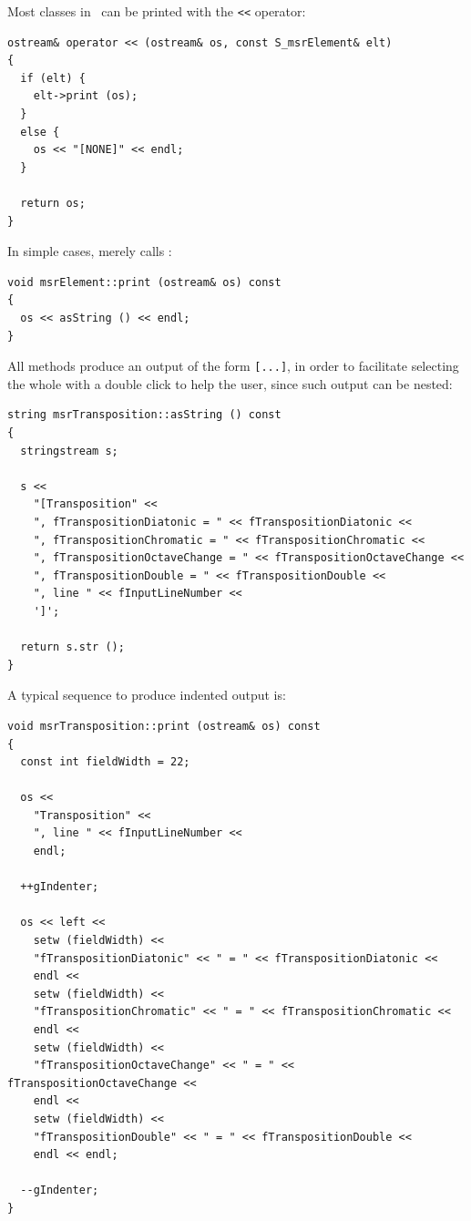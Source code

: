 Most classes in \mf\ can be printed with the {\tt <<} operator:
\begin{lstlisting}[language=CPlusPlus]
ostream& operator << (ostream& os, const S_msrElement& elt)
{
  if (elt) {
    elt->print (os);
  }
  else {
    os << "[NONE]" << endl;
  }

  return os;
}
\end{lstlisting}

In simple cases,  merely calls :
\begin{lstlisting}[language=CPlusPlus]
void msrElement::print (ostream& os) const
{
  os << asString () << endl;
}
\end{lstlisting}

All  methods produce an output of the form {\tt [...]}, in order to facilitate selecting the whole with a double click to help the user, since such output can be nested:
\begin{lstlisting}[language=CPlusPlus]
string msrTransposition::asString () const
{
  stringstream s;

  s <<
    "[Transposition" <<
    ", fTranspositionDiatonic = " << fTranspositionDiatonic <<
    ", fTranspositionChromatic = " << fTranspositionChromatic <<
    ", fTranspositionOctaveChange = " << fTranspositionOctaveChange <<
    ", fTranspositionDouble = " << fTranspositionDouble <<
    ", line " << fInputLineNumber <<
    ']';

  return s.str ();
}
\end{lstlisting}

A typical sequence to produce indented output is:
\begin{lstlisting}[language=CPlusPlus]
void msrTransposition::print (ostream& os) const
{
  const int fieldWidth = 22;

  os <<
    "Transposition" <<
    ", line " << fInputLineNumber <<
    endl;

  ++gIndenter;

  os << left <<
    setw (fieldWidth) <<
    "fTranspositionDiatonic" << " = " << fTranspositionDiatonic <<
    endl <<
    setw (fieldWidth) <<
    "fTranspositionChromatic" << " = " << fTranspositionChromatic <<
    endl <<
    setw (fieldWidth) <<
    "fTranspositionOctaveChange" << " = " << fTranspositionOctaveChange <<
    endl <<
    setw (fieldWidth) <<
    "fTranspositionDouble" << " = " << fTranspositionDouble <<
    endl << endl;

  --gIndenter;
}
\end{lstlisting}

